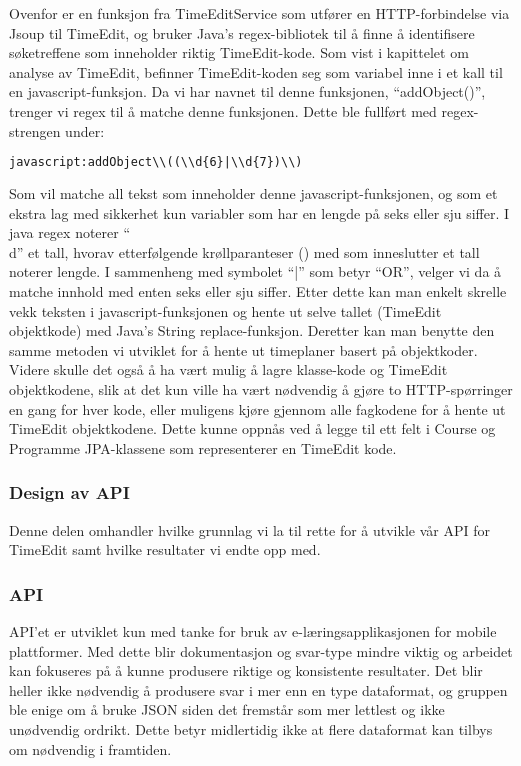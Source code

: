 \documentclass[../main.tex]{subfiles}
\begin{document}
Ovenfor er en funksjon fra TimeEditService som utfører en HTTP-forbindelse via Jsoup til TimeEdit, og bruker Java’s regex-bibliotek til å finne å identifisere søketreffene som inneholder riktig TimeEdit-kode. Som vist i kapittelet om analyse av TimeEdit, befinner TimeEdit-koden seg som variabel inne i et kall til en javascript-funksjon. Da vi har navnet til denne funksjonen, “addObject()”, trenger vi regex til å matche denne funksjonen. Dette ble fullført med regex-strengen under:

\begin{lstlisting}[language=HTML, frame=single, caption={asdasdsadasdasdasdsadsadasdasdsadsa}]
javascript:addObject\\((\\d{6}|\\d{7})\\)
\end{lstlisting}

Som vil matche all tekst som inneholder denne javascript-funksjonen, og som et ekstra lag med sikkerhet kun variabler som har en lengde på seks eller sju siffer. I java regex noterer “\\d” et tall, hvorav etterfølgende krøllparanteser ({}) med som inneslutter et tall noterer lengde. I sammenheng med symbolet “|” som betyr “OR”, velger vi da å matche innhold med enten seks eller sju siffer.
Etter dette kan man enkelt skrelle vekk teksten i javascript-funksjonen og hente ut selve tallet (TimeEdit objektkode) med Java’s String replace-funksjon.
Deretter kan man benytte den samme metoden vi utviklet for å hente ut timeplaner basert på objektkoder. Videre skulle det også å ha vært mulig å lagre klasse-kode og TimeEdit objektkodene, slik at det kun ville ha vært nødvendig å gjøre to HTTP-spørringer en gang for hver kode, eller muligens kjøre gjennom alle fagkodene for å hente ut TimeEdit objektkodene. Dette kunne oppnås ved å legge til ett felt i Course og Programme JPA-klassene som representerer en TimeEdit kode. 

\subsubsection{Design av API}
Denne delen omhandler hvilke grunnlag vi la til rette for å utvikle vår API for TimeEdit samt hvilke resultater vi endte opp med.

\subsubsection{API}
API’et er utviklet kun med tanke for bruk av e-læringsapplikasjonen for mobile plattformer. Med dette blir dokumentasjon og svar-type mindre viktig og arbeidet kan fokuseres på å kunne produsere riktige og konsistente resultater. Det blir heller ikke nødvendig å produsere svar i mer enn en type dataformat, og gruppen ble enige om å bruke JSON siden det fremstår som mer lettlest og ikke unødvendig ordrikt. Dette betyr midlertidig ikke at flere dataformat kan tilbys om nødvendig i framtiden.
\end{document}
